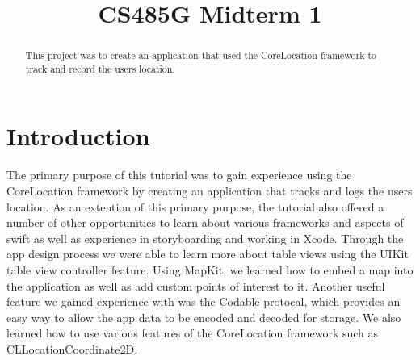 \documentclass[conference]{IEEEtran}
\begin{document}
\title{CS485G Midterm 1}

\author{
\and
{}
\and
{}
}

\maketitle

\begin{abstract}
This project was to create an application that used the CoreLocation framework to track
and record the users location.
\end{abstract}

\section{Introduction}
The primary purpose of this tutorial was to gain experience using the CoreLocation
framework by creating an application that tracks and logs the users location. As an
extention of this primary purpose, the tutorial also offered a number of other opportunities
to learn about various frameworks and aspects of swift as well as experience in storyboarding
and working in Xcode. Through the app design process we were able to learn more about
table views using the UIKit table view controller feature. Using MapKit, we 
learned how to embed a map into the application as well as add custom points of 
interest to it. Another useful feature we gained experience with was the Codable
protocal, which provides an easy way to allow the app data to be encoded and decoded
for storage. We also learned how to use various features of the CoreLocation 
framework such as CLLocationCoordinate2D.
\end{document}
